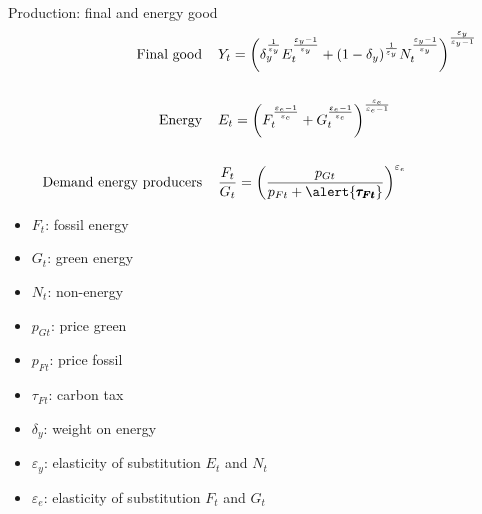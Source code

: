 \documentclass[11pt,aspectratio=169]{beamer}
\begin{document}
\begin{frame}{Production: final and energy good}
\vspace{-10mm}
\hypertarget{prodmod}{}
\begin{align*}
	\text{Final good}\hspace{4mm}&Y_t =\left(\delta_y^{\frac{1}{\varepsilon_y}}E_t^\frac{\varepsilon_y-1}{\varepsilon_y}+(1-\delta_y)^{\frac{1}{\varepsilon_y}}N_t^\frac{\varepsilon_y-1}{\varepsilon_y}\right)^\frac{\varepsilon_y}{\varepsilon_y-1} \\
	\ \\
	\text{Energy}\hspace{4mm}&E_t =\left({F}_t^\frac{\varepsilon_e-1}{\varepsilon_e}+G_t^\frac{\varepsilon_e-1}{\varepsilon_e}\right)^\frac{\varepsilon_e}{\varepsilon_e-1}\\
	\ \\
	\text{Demand energy producers}\hspace{4mm}&\frac{F_t}{G_t} = \left(\frac{p_{Gt}}{p_{Ft}+\alert{\pmb{\tau_{Ft}}}}\right)^{\varepsilon_e}
\end{align*}

\small
\vspace{4mm}
\hspace{-4mm}
\begin{minipage}[t!]{0.24\textwidth}
	\vspace{0mm}
	\begin{itemize}	
		\item[]$F_t$: fossil energy
		\vspace{-2mm}	
		\item[]$G_t$: green energy
		\vspace{-2mm}	
		\item[]$N_t$: non-energy
	\end{itemize}
\end{minipage}
\begin{minipage}[t!]{0.24\textwidth}
	\vspace{0mm}
	\begin{itemize}
		\item[] $p_{Gt}$: price green  \vspace{-2mm}
		\item[] $p_{Ft}$: price fossil
		\vspace{-2mm}	
		\item[] $\tau_{Ft}$: carbon tax
	\end{itemize}
\end{minipage}
\begin{minipage}[t!]{0.47\textwidth}
	\vspace{0mm}
	\begin{itemize}
		\item[] $\delta_{y}$: weight on energy\vspace{-2mm}
		\item[] $\varepsilon_y$: elasticity of substitution $E_t$ and $N_t$ \vspace{-2mm}
		\item[] $\varepsilon_e$: elasticity of substitution $F_t$ and $G_t$
	\end{itemize}
\end{minipage}
\end{frame}
\end{document}
